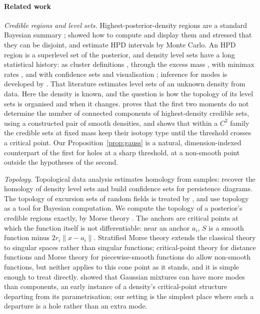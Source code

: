 \paragraph{Related work}
\emph{Credible regions and level sets.} Highest-posterior-density regions are a standard Bayesian summary
\citep{boxtiao1973,berger1985}; \citet{hyndman1996} showed how to compute and display them and stressed that they can
be disjoint, and \citet{chenshao1999} estimate HPD intervals by Monte Carlo. An HPD region is a superlevel set of the posterior,
and density level sets have a long statistical history: as cluster definitions \citep{hartigan1975,rinaldo2010,chacon2015},
through the excess mass \citep{polonik1995}, with minimax rates \citep{tsybakov1997}, and with confidence sets and
visualisation \citep{chen2017}; inference for modes is developed by \citet{genovese2016}. That literature estimates level
sets of an unknown density from data. Here the density is known, and the question is how the topology of its level sets
is organised and when it changes. \citet[Theorem~2]{tommei2026} proves that the first two moments do not determine the number of
connected components of highest-density credible sets, using a constructed pair of smooth densities, and
\citet[Theorem~3]{tommei2026} shows that within a $C^2$ family the credible sets at fixed mass keep their isotopy type
until the threshold crosses a critical point. Our Proposition~\ref{prop:gauss} is a natural, dimension-indexed
counterpart of the first for holes at a sharp threshold, at a non-smooth point outside the hypotheses of the second.

\emph{Topology.} Topological data analysis \citep{carlsson2009,edelsbrunner2010,wasserman2018} estimates homology from
samples: \citet{bobrowski2017} recover the homology of density level sets and \citet{fasy2014} build confidence sets for
persistence diagrams. The topology of excursion sets of random fields is treated by \citet{adler2007}, and
\citet{rohrscheidt2024} use topology as a tool for Bayesian computation. We compute the topology of a posterior's
credible regions exactly, by Morse theory \citep{milnor1963}. The anchors are critical points at which the function
itself is not differentiable: near an anchor $a_i$, $S$ is a smooth function minus $2r_i\|x - a_i\|$. Stratified Morse
theory \citep{goresky1988} extends the classical theory to singular spaces rather than singular functions; critical-point
theory for distance functions \citep{groveshiohama1977,grove1993} and Morse theory for piecewise-smooth functions
\citep{agrachev1997} do allow non-smooth functions, but neither applies to this cone point as it stands, and it is simple
enough to treat directly. \citet{carreira2003} showed that
Gaussian mixtures can have more modes than components, an early instance of a density's critical-point structure
departing from its parametrisation; our setting is the simplest place where such a departure is a hole rather than an
extra mode.

